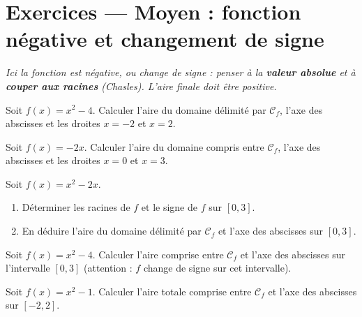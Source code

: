 \documentclass[11pt,a4paper]{article}
\begin{document}
\section*{Exercices — Moyen : fonction négative et changement de signe}

\begin{center}\itshape\small
Ici la fonction est négative, ou change de signe : penser à la \textbf{valeur absolue} et à
\textbf{couper aux racines} (Chasles). L'aire finale doit être positive.
\end{center}

\begin{exo}
Soit $f(x)=x^2-4$. Calculer l'aire du domaine délimité par $\mathcal{C}_f$, l'axe des abscisses et
les droites $x=-2$ et $x=2$.

\smallskip
\begin{center}
\end{center}
\end{exo}

\begin{exo}
Soit $f(x)=-2x$. Calculer l'aire du domaine compris entre $\mathcal{C}_f$, l'axe des abscisses et
les droites $x=0$ et $x=3$.
\end{exo}

\begin{exo}
Soit $f(x)=x^2-2x$.
\begin{enumerate}[label=\alph*),leftmargin=2em,topsep=2pt]
  \item Déterminer les racines de $f$ et le signe de $f$ sur $[0,3]$.
  \item En déduire l'aire du domaine délimité par $\mathcal{C}_f$ et l'axe des abscisses sur $[0,3]$.
\end{enumerate}
\end{exo}

\begin{exo}
Soit $f(x)=x^2-4$. Calculer l'aire comprise entre $\mathcal{C}_f$ et l'axe des abscisses sur
l'intervalle $[0,3]$ (attention : $f$ change de signe sur cet intervalle).
\end{exo}

\begin{exo}
Soit $f(x)=x^2-1$. Calculer l'aire totale comprise entre $\mathcal{C}_f$ et l'axe des abscisses sur
$[-2,2]$.
\end{exo}
\end{document}
